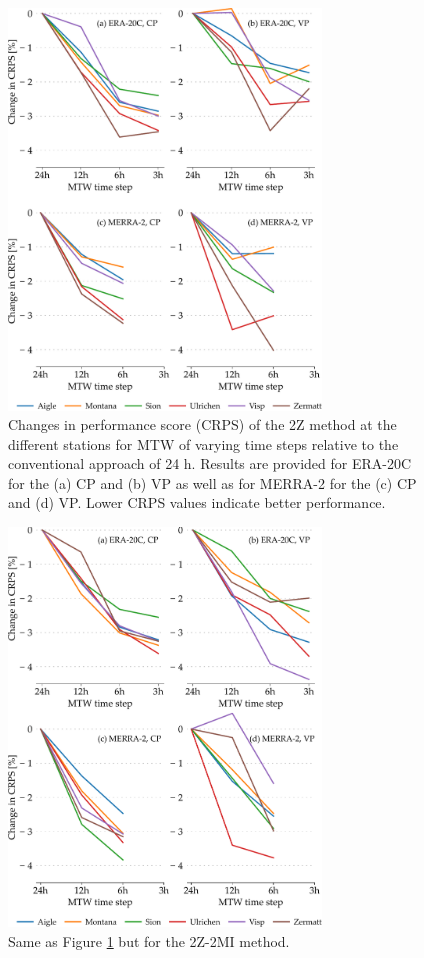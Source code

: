 \documentclass[hess, manuscript]{copernicus}
\begin{document}
	\begin{figure}[htb]
		\includegraphics[width=8.3cm]{fig09.pdf}
		\caption{Changes in performance score (CRPS) of the 2Z method at the different stations for MTW of varying time steps relative to the conventional approach of 24 h. Results are provided for ERA-20C for the (a) CP and (b) VP as well as for MERRA-2 for the (c) CP and (d) VP. Lower CRPS values indicate better performance.}
		\label{fig:plots_CRPS_2Z}
	\end{figure}
	
	\begin{figure}[htb]
		\includegraphics[width=8.3cm]{fig10.pdf}
		\caption{Same as Figure \ref{fig:plots_CRPS_2Z} but for the 2Z-2MI method.}
		\label{fig:plots_CRPS_2Z-2MI}
	\end{figure}
	
\end{document}
